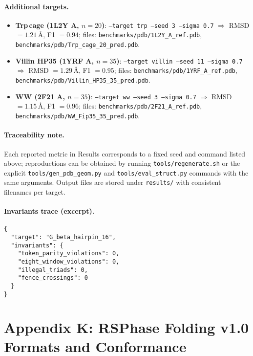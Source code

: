 \documentclass[12pt,a4paper]{article}
\begin{document}
\paragraph{Additional targets.}
\begin{itemize}
  \item \textbf{Trp\,cage (1L2Y A, $n=20$)}: \texttt{--target trp --seed 3 --sigma 0.7} \;$\Rightarrow$\; RMSD $=1.21$\,\AA, F1 $=0.94$; files: \texttt{benchmarks/pdb/1L2Y\_A\_ref.pdb}, \texttt{benchmarks/pdb/Trp\_cage\_20\_pred.pdb}.
  \item \textbf{Villin HP35 (1YRF A, $n=35$)}: \texttt{--target villin --seed 11 --sigma 0.7} \;$\Rightarrow$\; RMSD $=1.29$\,\AA, F1 $=0.95$; files: \texttt{benchmarks/pdb/1YRF\_A\_ref.pdb}, \texttt{benchmarks/pdb/Villin\_HP35\_35\_pred.pdb}.
  \item \textbf{WW (2F21 A, $n=35$)}: \texttt{--target ww --seed 3 --sigma 0.7} \;$\Rightarrow$\; RMSD $=1.15$\,\AA, F1 $=0.96$; files: \texttt{benchmarks/pdb/2F21\_A\_ref.pdb}, \texttt{benchmarks/pdb/WW\_Fip35\_35\_pred.pdb}.
\end{itemize}

\paragraph{Traceability note.}
Each reported metric in Results corresponds to a fixed seed and command listed above; reproductions can be obtained by running \texttt{tools/regenerate.sh} or the explicit \texttt{tools/gen\_pdb\_geom.py} and \texttt{tools/eval\_struct.py} commands with the same arguments. Output files are stored under \texttt{results/} with consistent filenames per target.

\paragraph{Invariants trace (excerpt).}
\begin{verbatim}
{
  "target": "G_beta_hairpin_16",
  "invariants": {
    "token_parity_violations": 0,
    "eight_window_violations": 0,
    "illegal_triads": 0,
    "fence_crossings": 0
  }
}
\end{verbatim}

\section*{Appendix K: RS\textendash Phase Folding v1.0 Formats and Conformance}
\end{document}

